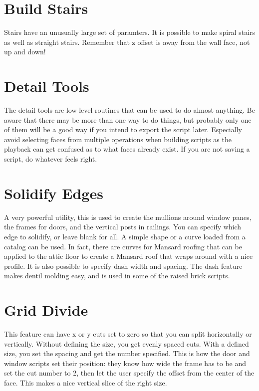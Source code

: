\documentclass[11pt]{article}
\begin{document}
    \section{Build Stairs}
    Stairs have an unusually large set of paramters.
    It is possible to make spiral stairs as well as straight stairs.
    Remember that z offset is away from the wall face, not up and down!

    \section{Detail Tools}
    The detail tools are low level routines that can be used to do almost anything.
    Be aware that there may be more than one way to do things, but probably only one of them will be a good way if you
    intend to export the script later.
    Especially avoid selecting faces from multiple operations when building scripts as the playback can get confused as
    to what faces already exist.
    If you are not saving a script, do whatever feels right.

    \section{Solidify Edges}
    A very powerful utility, this is used to create the mullions around window panes, the frames for doors, and the
    vertical posts in railings.
    You can specify which edge to solidify, or leave blank for all.
    A simple shape or a curve loaded from a catalog can be used.
    In fact, there are curves for Mansard roofing that can be applied to the attic floor to create a Mansard roof that
    wraps around with a nice profile.
    It is also possible to specify dash width and spacing.
    The dash feature makes dentil molding easy, and is used in some of the raised brick scripts.

    \section{Grid Divide}
    This feature can have x or y cuts set to zero so that you can split horizontally or vertically.
    Without defining the size, you get evenly spaced cuts.
    With a defined size, you set the spacing and get the number specified.
    This is how the door and window scripts set their position: they know how wide the frame has to be and set the cut
    number to 2, then let the user specify the offset from the center of the face.
    This makes a nice vertical slice of the right size.
\end{document}
